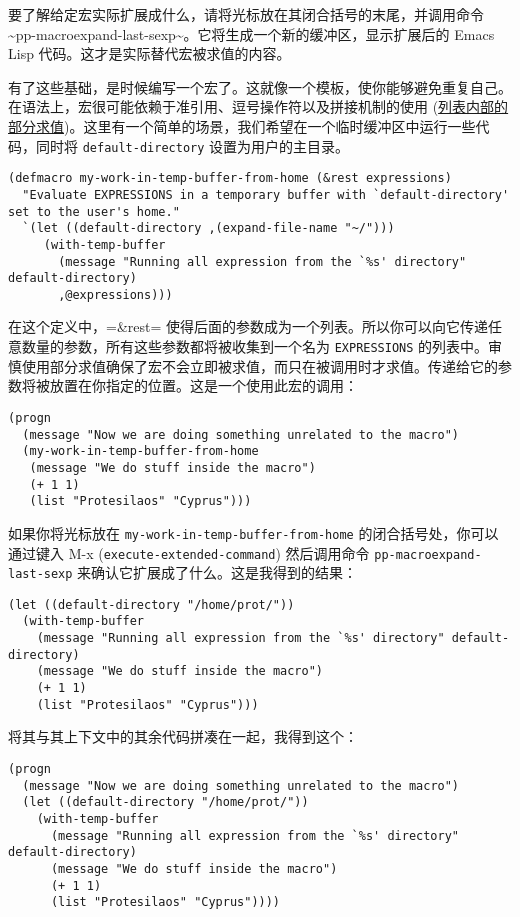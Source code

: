 \documentclass[11pt]{ctexart}
\begin{document}
要了解给定宏实际扩展成什么，请将光标放在其闭合括号的末尾，并调用命令 \textasciitilde{}pp-macroexpand-last-sexp\textasciitilde{}。它将生成一个新的缓冲区，显示扩展后的 Emacs Lisp 代码。这才是实际替代宏被求值的内容。

有了这些基础，是时候编写一个宏了。这就像一个模板，使你能够避免重复自己。在语法上，宏很可能依赖于准引用、逗号操作符以及拼接机制的使用 (\hyperref[sec:org7fa9c71]{列表内部的部分求值})。这里有一个简单的场景，我们希望在一个临时缓冲区中运行一些代码，同时将 \texttt{default-directory} 设置为用户的主目录。

\begin{verbatim}
(defmacro my-work-in-temp-buffer-from-home (&rest expressions)
  "Evaluate EXPRESSIONS in a temporary buffer with `default-directory' set to the user's home."
  `(let ((default-directory ,(expand-file-name "~/")))
     (with-temp-buffer
       (message "Running all expression from the `%s' directory" default-directory)
       ,@expressions)))
\end{verbatim}

在这个定义中，=\&rest= 使得后面的参数成为一个列表。所以你可以向它传递任意数量的参数，所有这些参数都将被收集到一个名为 \texttt{EXPRESSIONS} 的列表中。审慎使用部分求值确保了宏不会立即被求值，而只在被调用时才求值。传递给它的参数将被放置在你指定的位置。这是一个使用此宏的调用：

\begin{verbatim}
(progn
  (message "Now we are doing something unrelated to the macro")
  (my-work-in-temp-buffer-from-home
   (message "We do stuff inside the macro")
   (+ 1 1)
   (list "Protesilaos" "Cyprus")))
\end{verbatim}

如果你将光标放在 \texttt{my-work-in-temp-buffer-from-home} 的闭合括号处，你可以通过键入 M-x (\texttt{execute-extended-command}) 然后调用命令 \texttt{pp-macroexpand-last-sexp} 来确认它扩展成了什么。这是我得到的结果：

\begin{verbatim}
(let ((default-directory "/home/prot/"))
  (with-temp-buffer
    (message "Running all expression from the `%s' directory" default-directory)
    (message "We do stuff inside the macro")
    (+ 1 1)
    (list "Protesilaos" "Cyprus")))
\end{verbatim}

将其与其上下文中的其余代码拼凑在一起，我得到这个：

\begin{verbatim}
(progn
  (message "Now we are doing something unrelated to the macro")
  (let ((default-directory "/home/prot/"))
    (with-temp-buffer
      (message "Running all expression from the `%s' directory" default-directory)
      (message "We do stuff inside the macro")
      (+ 1 1)
      (list "Protesilaos" "Cyprus"))))
\end{verbatim}
\end{document}
